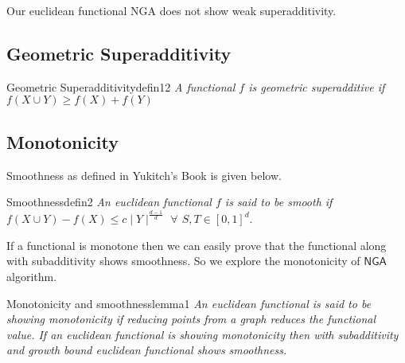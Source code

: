 \documentclass{article}
\begin{document}
Our euclidean functional \textsf{NGA} does not show weak superadditivity.

\subsection*{Geometric Superadditivity}

\begin{define}{Geometric Superadditivity}{defin12}
    \textit{A functional $f$ is geometric superadditive if $f(X \cup Y) \geq f(X) + f(Y)$}
\end{define}

\subsection{Monotonicity}

Smoothness as defined in Yukitch's Book is given below.

\begin{define}{Smoothness}{defin2}
    \textit{An euclidean functional $f$ is said to be smooth if $f(X \cup Y) - f(X)\leq c\mid Y\mid^{\frac{d-1}{d}}$
    $\forall$ $S, T \in [0,1]^d$}.
\end{define}

If a functional is monotone then we can easily prove that the functional along with 
subadditivity shows smoothness. So we explore the monotonicity of $\textsf{NGA}$ algorithm.

\begin{lemma}{Monotonicity and smoothness}{lemma1}
    \textit{An euclidean functional is said to be showing monotonicity if reducing points from a graph reduces the functional value.
    If an euclidean functional is showing monotonicity then with subadditivity and growth bound euclidean functional shows smoothness.}
\end{lemma}
\end{document}

